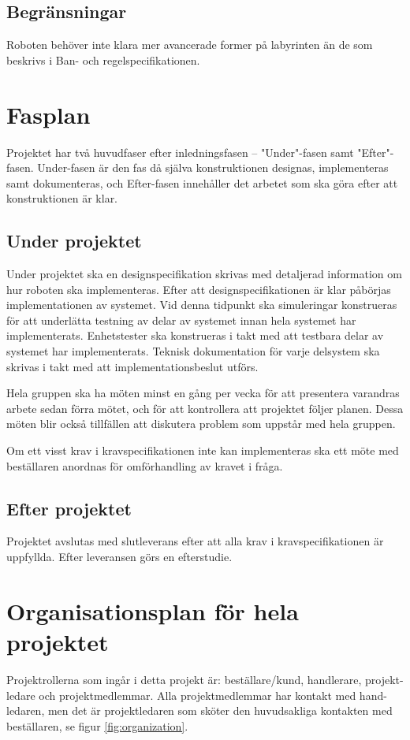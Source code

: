 \documentclass[a4paper,titlepage,12pt]{article}
\begin{document}
	
	\subsection{Begränsningar}
	Roboten behöver inte klara mer avancerade former på labyrinten än de som
	beskrivs i Ban- och regelspecifikationen.
	
	
	\section{Fasplan}
    Projektet har två huvudfaser efter inledningsfasen -- "Under"-fasen samt
    "Efter"-fasen. Under-fasen är den fas då själva konstruktionen designas, 
    implementeras samt dokumenteras, och Efter-fasen innehåller det arbetet som
    ska göra efter att konstruktionen är klar.
	
	\subsection{Under projektet}
	Under projektet ska en designspecifikation skrivas med detaljerad
	information om hur roboten ska implementeras. Efter att
	designspecifikationen är klar påbörjas implementationen av systemet. Vid
    denna tidpunkt ska simuleringar konstrueras för att underlätta testning av
    delar av systemet innan hela systemet har implementerats.
	Enhetstester ska konstrueras i takt med att testbara delar av systemet har
	implementerats. Teknisk dokumentation för varje delsystem ska skrivas
	i takt med att implementationsbeslut utförs.

	Hela gruppen ska ha möten minst en gång per vecka för att presentera
	varandras arbete sedan förra mötet, och för att kontrollera att projektet
	följer planen. Dessa möten blir också tillfällen att diskutera problem som
	uppstår med hela gruppen.

	Om ett visst krav i kravspecifikationen inte kan implementeras ska ett möte
	med beställaren anordnas för omförhandling av kravet i fråga.
	
	\subsection{Efter projektet}
	Projektet avslutas med slutleverans efter att alla krav i
	kravspecifikationen är uppfyllda. Efter leveransen görs en efterstudie.
	
	
	\section{Organisationsplan för hela projektet}
	Projektrollerna som ingår i detta projekt är: beställare/kund, handlerare,
	projekt-ledare och projektmedlemmar. Alla projektmedlemmar har kontakt med
	hand-ledaren, men det är projektledaren som sköter den huvudsakliga
	kontakten med beställaren, se figur \ref{fig:organization}.
\end{document}
